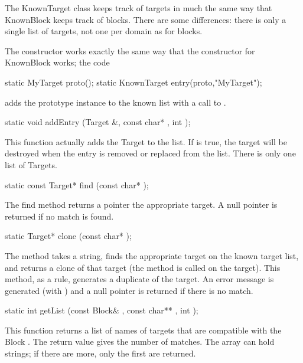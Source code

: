 The KnownTarget class keeps track of targets in much the same way
that KnownBlock keeps track of blocks.  There are some differences:
there is only a single list of targets, not one per domain as for
blocks.

The constructor works exactly the same way that the constructor for
KnownBlock works; the code

\begin{example}
static MyTarget proto();
static KnownTarget entry(proto,"MyTarget");
\end{example}

adds the prototype instance to the known list with a call to
.

\begin{example}
static void addEntry (Target &, const char* , int );
\end{example}

This function actually adds the Target to the list.  If  is true,
the target will be destroyed when the entry is removed or replaced from
the list.  There is only one list of Targets.

\begin{example}
static const Target* find (const char* );
\end{example}

The find method returns a pointer the appropriate target.
A null pointer is returned if no match
is found.

\begin{example}
static Target* clone (const char* );
\end{example}

The  method takes a string, finds the appropriate target on
the known target list, and returns a clone of that target (the
 method is called on the target).  This method, as
a rule, generates a duplicate of the target.
An error message is generated (with ) and
a null pointer is returned if there is no match.

\begin{example}
static int getList (const Block& , const char** , int );
\end{example}

This function returns a list of names of targets that are compatible
with the Block .  The return value gives the number of matches.
The  array can hold  strings; if there are more,
only the first  are returned.

